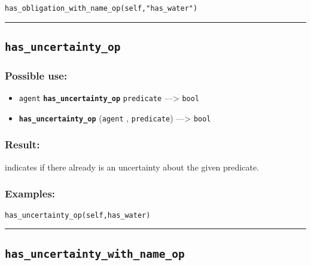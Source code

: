 \documentclass[]{book}
\providecommand{\tightlist}{%
  \setlength{\itemsep}{0pt}\setlength{\parskip}{0pt}}
\theoremstyle{definition}
\theoremstyle{definition}
\theoremstyle{definition}
\theoremstyle{remark}
\begin{document}
\begin{verbatim}
has_obligation_with_name_op(self,"has_water") 
\end{verbatim}

\begin{center}\rule{0.5\linewidth}{\linethickness}\end{center}

\subsection{\texorpdfstring{\texttt{has\_uncertainty\_op}}{has\_uncertainty\_op}}\label{has_uncertainty_op}

\subsubsection{Possible use:}\label{possible-use-256}

\begin{itemize}
\tightlist
\item
  \texttt{agent} \textbf{\texttt{has\_uncertainty\_op}}
  \texttt{predicate} ---\textgreater{} \texttt{bool}
\item
  \textbf{\texttt{has\_uncertainty\_op}} (\texttt{agent} ,
  \texttt{predicate}) ---\textgreater{} \texttt{bool}
\end{itemize}

\subsubsection{Result:}\label{result-247}

indicates if there already is an uncertainty about the given predicate.

\subsubsection{Examples:}\label{examples-196}

\begin{verbatim}
has_uncertainty_op(self,has_water) 
\end{verbatim}

\begin{center}\rule{0.5\linewidth}{\linethickness}\end{center}

\subsection{\texorpdfstring{\texttt{has\_uncertainty\_with\_name\_op}}{has\_uncertainty\_with\_name\_op}}\label{has_uncertainty_with_name_op}
\end{document}
